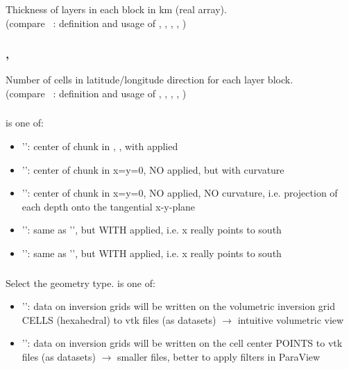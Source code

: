 \subsubsection{}
Thickness of layers in each block in km (real array).\\
(compare ~: definition and usage of , 
, , , )
\subsubsection{, }
Number of cells in latitude/longitude direction for each layer block.\\
(compare ~: definition and usage of , 
, , , )
\subsubsection{}
 is one of:
\begin{itemize}
\item[] '': center of chunk in , , with applied 
\item[] '': center of chunk in x=y=0, NO  applied, but with curvature
\item[] '': center of chunk in x=y=0, NO  applied, NO curvature, i.e. projection of each depth onto the tangential x-y-plane
\item[] '': same as '', but WITH  applied, i.e. x really points to south
\item[] '': same as '', but WITH  applied, i.e. x really points to south
\end{itemize}
\subsubsection{}
Select the geometry type.  is one of:
\begin{itemize}
\item[]'': data on inversion grids will be written on the volumetric inversion grid CELLS (hexahedral) to vtk files (as  datasets) $\rightarrow$ intuitive volumetric view
\item[]'': data on inversion grids will be written on the cell center POINTS to vtk files (as  datasets) $\rightarrow$ smaller files, better to apply filters in ParaView
\end{itemize}

